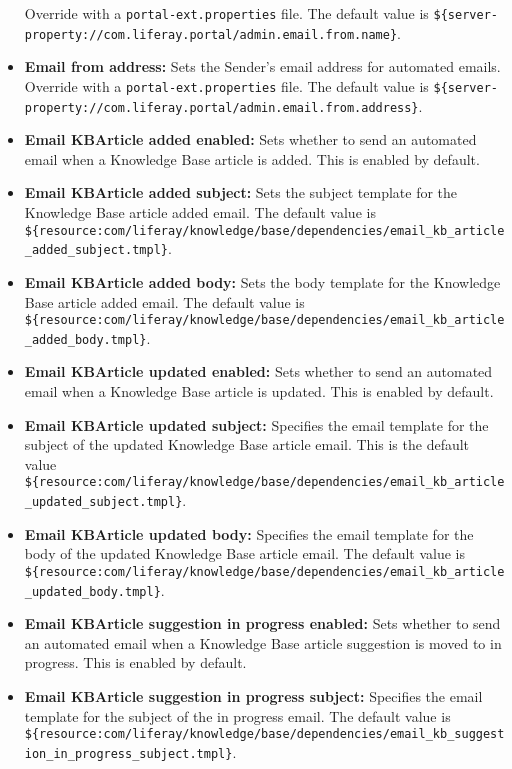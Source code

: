 \begin{itemize}
  Override with a \texttt{portal-ext.properties} file. The default value
  is
  \texttt{\$\{server-property://com.liferay.portal/admin.email.from.name\}}.
\item
  \textbf{Email from address:} Sets the Sender's email address for
  automated emails. Override with a \texttt{portal-ext.properties} file.
  The default value is
  \texttt{\$\{server-property://com.liferay.portal/admin.email.from.address\}}.
\item
  \textbf{Email KBArticle added enabled:} Sets whether to send an
  automated email when a Knowledge Base article is added. This is
  enabled by default.
\item
  \textbf{Email KBArticle added subject:} Sets the subject template for
  the Knowledge Base article added email. The default value is
  \texttt{\$\{resource:com/liferay/knowledge/base/dependencies/email\_kb\_article\_added\_subject.tmpl\}}.
\item
  \textbf{Email KBArticle added body:} Sets the body template for the
  Knowledge Base article added email. The default value is
  \texttt{\$\{resource:com/liferay/knowledge/base/dependencies/email\_kb\_article\_added\_body.tmpl\}}.
\item
  \textbf{Email KBArticle updated enabled:} Sets whether to send an
  automated email when a Knowledge Base article is updated. This is
  enabled by default.
\item
  \textbf{Email KBArticle updated subject:} Specifies the email template
  for the subject of the updated Knowledge Base article email. This is
  the default value
  \texttt{\$\{resource:com/liferay/knowledge/base/dependencies/email\_kb\_article\_updated\_subject.tmpl\}}.
\item
  \textbf{Email KBArticle updated body:} Specifies the email template
  for the body of the updated Knowledge Base article email. The default
  value is
  \texttt{\$\{resource:com/liferay/knowledge/base/dependencies/email\_kb\_article\_updated\_body.tmpl\}}.
\item
  \textbf{Email KBArticle suggestion in progress enabled:} Sets whether
  to send an automated email when a Knowledge Base article suggestion is
  moved to in progress. This is enabled by default.
\item
  \textbf{Email KBArticle suggestion in progress subject:} Specifies the
  email template for the subject of the in progress email. The default
  value is
  \texttt{\$\{resource:com/liferay/knowledge/base/dependencies/email\_kb\_suggestion\_in\_progress\_subject.tmpl\}}.

\end{itemize}
